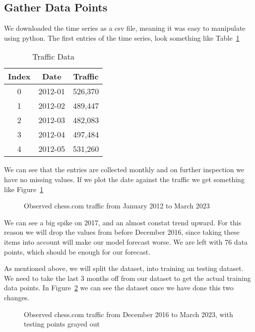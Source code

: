 \documentclass[journal]{IEEEtran}
\begin{document}
\subsection{Gather Data Points}

We downloaded the time series as a csv file, meaning it was easy to manipulate
using python. The first entries of the time series, look something like
Table~\ref{tab:traffic}

\begin{table}[htbp]
  \centering
  \caption{Traffic Data}
  \label{tab:traffic}
  \begin{tabular}{|c|c|c|}
    \hline
    Index & Date & Traffic \\
    \hline
    0 & 2012-01 & 526,370 \\
    1 & 2012-02 & 489,447 \\
    2 & 2012-03 & 482,083 \\
    3 & 2012-04 & 497,484 \\
    4 & 2012-05 & 531,260 \\
    \hline
  \end{tabular}
\end{table}

We can see that the entries are collected monthly and on further inspection we
have no missing values. If we plot the date against the traffic we get
something like Figure~\ref{fig:obs}

\begin{figure}[htbp]
  \centering
  
    \caption{Observed chess.com traffic from January 2012 to March 2023}
  \label{fig:obs}
\end{figure}

We can see a big spike on 2017, and an almost constat trend upward. For this
reason we will drop the values from before December 2016, since taking these
items into account will make our model forecast worse. We are left with 76
data points, which should be enough for our forecast.

As mentioned above, we will split the dataset, into training an testing
dataset. We need to take the last 3 months off from our dataset to get the
actual training data points. In Figure~\ref{fig:obs-2} we can see the dataset
once we have done this two changes.

\begin{figure}[htbp]
  \centering
  
    \caption{Observed chess.com traffic from December 2016 to March 2023, with
        testing points grayed out}
    \label{fig:obs-2}
\end{figure}
\end{document}
